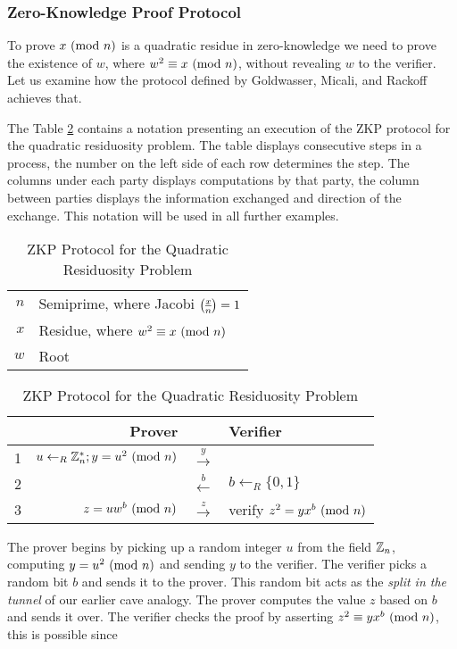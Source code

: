\subsubsection{Zero-Knowledge Proof Protocol}
To prove $x \ (\mathrm{mod}\ n)$ is a quadratic residue in zero-knowledge we need to prove the existence of $w$, where $w^2 \equiv x \ (\mathrm{mod}\ n)$, without revealing $w$ to the verifier.
Let us examine how the protocol \cite{goldwasser1989knowledge} defined by Goldwasser, Micali, and Rackoff achieves that.

\bigskip
\noindent
The Table \ref{table:zkp-qrp} contains a notation presenting an execution of the ZKP protocol for the quadratic residuosity problem.
The table displays consecutive steps in a process, the number on the left side of each row determines the step.
The columns under each party displays computations by that party, the column between parties displays the information exchanged and direction of the exchange.
This notation will be used in all further examples.

\bigskip
\begin{table}[h!]
	\centering
	\bigskip
	\begin{tabular}{rl}
		$n$ & Semiprime, where Jacobi $\legendre{x}{n} = 1$\\
 		$x$ & Residue, where $w^2 \equiv x \ (\mathrm{mod}\ n)$\\
 		$w$ & Root\\
	\end{tabular}
	\medskip
	\begin{tabular}{r|r|c|l}
	\label{table:zkp-qrp}
		& Prover && Verifier\\
		\hline
		1&$u \leftarrow_R \Bbb{Z}_{n}^{*}; y = u^2 \ (\mathrm{mod}\ n)$ & $\xrightarrow{y}$\\
		2 & & $\xleftarrow{b}$ & $b \leftarrow_R \{0, 1\} $\\
		3 &$z = uw^b\ (\mathrm{mod}\ n)$ & $\xrightarrow z$ & verify $z^2 = yx^b \ (\mathrm{mod}\ n)$\\
	\end{tabular}
		\caption{ZKP Protocol for the Quadratic Residuosity Problem}
\end{table}

\bigskip \noindent
The prover begins by picking up a random integer $u$ from the field $\Bbb{Z}_{n}$, computing $y = u^2 \ (\mathrm{mod}\ n)$ and sending $y$ to the verifier.
The verifier picks a random bit $b$ and sends it to the prover. This random bit acts as the \textit{split in the tunnel} of our earlier cave analogy.
The prover computes the value $z$ based on $b$ and sends it over.
The verifier checks the proof by asserting $z^2 \equiv yx^b \ (\mathrm{mod}\ n)$, this is possible since


